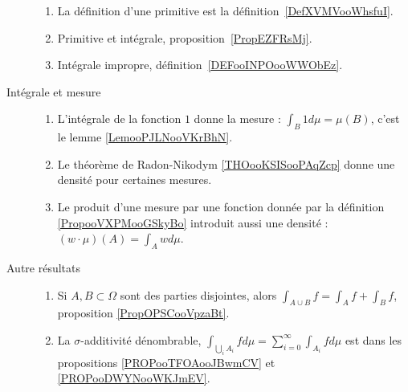 \begin{description}
\begin{enumerate}
			\item
			      La définition d'une primitive est la définition~\ref{DefXVMVooWhsfuI}.
			\item
			      Primitive et intégrale, proposition~\ref{PropEZFRsMj}.
			\item
			      Intégrale impropre, définition~\ref{DEFooINPOooWWObEz}.
		\end{enumerate}
	\item[Intégrale et mesure]
		\begin{enumerate}
			\item
			      L'intégrale de la fonction \( 1\) donne la mesure : \( \int_B1d\mu=\mu(B)\), c'est le lemme \ref{LemooPJLNooVKrBhN}.
			\item
			      Le théorème de Radon-Nikodym \ref{THOooKSISooPAqZcp} donne une densité pour certaines mesures.
			\item
			      Le produit d'une mesure par une fonction donnée par la définition \ref{PropooVXPMooGSkyBo} introduit aussi une densité : \( (w\cdot \mu)(A)=\int_Awd\mu\).
		\end{enumerate}

	\item[Autre résultats]
		\begin{enumerate}
			\item
			      Si \( A,B\subset \Omega\) sont des parties disjointes, alors \( \int_{A\cup B}f=\int_Af+\int_Bf\), proposition \ref{PropOPSCooVpzaBt}.
			\item
			      La \( \sigma\)-additivité dénombrable, \( \int_{\bigcup_iA_i}fd\mu=\sum_{i=0}^{\infty}\int_{A_i}fd\mu\) est dans les propositions \ref{PROPooTFOAooJBwmCV} et \ref{PROPooDWYNooWKJmEV}.
		\end{enumerate}
\end{description}
